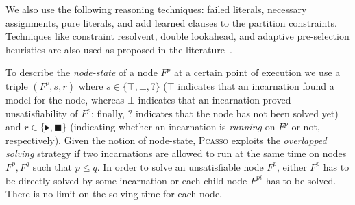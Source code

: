\documentclass[conference]{IEEEtran}
\newcommand{\1}{x_1}
\newcommand{\2}{x_2}
\newcommand{\3}{x_3}
\newcommand{\4}{x_4}
\newcommand{\5}{x_5}
\newcommand{\6}{x_6}
\newcommand{\7}{x_7}
\newcommand{\8}{x_8}
\newcommand{\9}{x_9}
\newcommand{\pcasso}{\textsc{Pcasso}\xspace}
\newcommand{\cubeandconquer}{\textsc{CubeAndConquer}\xspace}
\begin{document}
We also use the following reasoning techniques: failed literals, necessary assignments, pure literals, and add learned clauses to the partition constraints. 
Techniques like constraint resolvent, double lookahead, and adaptive pre-selection heuristics are also used as proposed in the literature~\cite{HvM09HBSAT}. 

To describe the \emph{node-state} of a node $F^p$ at a certain point of execution we use a triple $(F^p,s,r)$ where $s \in \{\top, \bot, ?\}$ ($\top$ indicates that an incarnation found a model for the node, whereas $\bot$ indicates that an incarnation proved unsatisfiability of $F^p$; finally, $?$ indicates that the node has not been solved yet) and $r \in  \{\blacktriangleright, \blacksquare\}$ (indicating whether an incarnation is \emph{running} on $F^p$ or not, respectively). 
%
Given the notion of node-state, 
\pcasso exploits the \emph{overlapped solving} strategy if two incarnations are allowed to run at the same time on nodes $F^p, F^q$ such that $p \le q$. 
In order to solve an unsatisfiable node $F^p$, either $F^p$ has to be directly solved by some incarnation or each child node $F^{pi}$ has to be solved. 
There is no limit on the solving time for each node.
\end{document}
